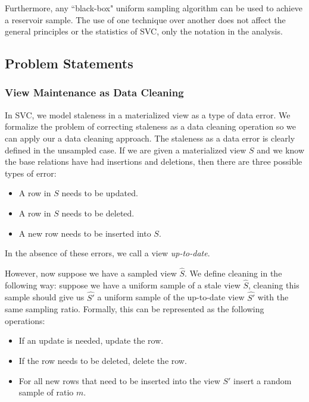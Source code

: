 Furthermore, any ``black-box" uniform sampling algorithm can be used to achieve a reservoir sample.
The use of one technique over another does not affect the general principles or the statistics of SVC, only the 
notation in the analysis.
\fi

\subsection{Problem Statements}
\subsubsection{View Maintenance as Data Cleaning}\label{cleaning}
In SVC, we model staleness in a materialized view as a type of data error.
We formalize the problem of correcting staleness as a data cleaning operation so we can apply our a data cleaning approach.
The staleness as a data error is clearly defined in the unsampled case.
If we are given a materialized view $S$ and we know the base relations have had insertions and deletions, then there are three possible types of error:
\begin{itemize}[noitemsep]
\item A row in $S$ needs to be updated.
\item A row in $S$ needs to be deleted.
\item A new row needs to be inserted into $S$.
\end{itemize}
In the absence of these errors, we call a view \emph{up-to-date}.

However, now suppose we have a sampled view $\hat{S}$.
We define cleaning in the following way: suppose we have a uniform sample of a stale view $\hat{S}$, cleaning this sample
should give us $\hat{S'}$ a uniform sample of the up-to-date view $\hat{S'}$ with the same sampling ratio.
Formally, this can be represented as the following operations:
\begin{itemize}[noitemsep]
\item If an update is needed, update the row.
\item If the row needs to be deleted, delete the row.
\item For all new rows that need to be inserted into the view $S'$ insert a random sample of ratio $m$.
\end{itemize}

